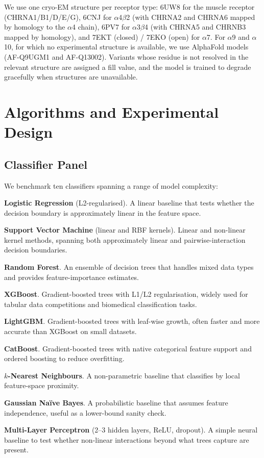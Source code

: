 \documentclass{ws-procs11x85}
\begin{document}
We use one cryo-EM structure per receptor type: 6UW8 for the muscle
receptor (CHRNA1/B1/D/E/G), 6CNJ for $\alpha$4$\beta$2 (with CHRNA2 and
CHRNA6 mapped by homology to the $\alpha$4 chain), 6PV7 for
$\alpha$3$\beta$4 (with CHRNA5 and CHRNB3 mapped by homology), and 7EKT
(closed) / 7EKO (open) for $\alpha$7. For $\alpha$9 and $\alpha$10, for
which no experimental structure is available, we use AlphaFold models
(AF-Q9UGM1 and AF-Q13002). Variants whose residue is not resolved in the
relevant structure are assigned a fill value, and the model is trained
to degrade gracefully when structures are unavailable.

\section{Algorithms and Experimental Design}\label{sec:algorithms}

\subsection{Classifier Panel}

We benchmark ten classifiers spanning a range of model complexity:

\begin{itemlist}
\item \textbf{Logistic Regression} (L2-regularised). A linear baseline
  that tests whether the decision boundary is approximately linear in
  the feature space.
\item \textbf{Support Vector Machine} (linear and RBF kernels). Linear
  and non-linear kernel methods, spanning both approximately linear and
  pairwise-interaction decision boundaries.
\item \textbf{Random Forest}. An ensemble of decision trees that handles
  mixed data types and provides feature-importance estimates.
\item \textbf{XGBoost}. Gradient-boosted trees with L1/L2 regularisation,
  widely used for tabular data competitions and biomedical
  classification tasks.
\item \textbf{LightGBM}. Gradient-boosted trees with leaf-wise growth,
  often faster and more accurate than XGBoost on small datasets.
\item \textbf{CatBoost}. Gradient-boosted trees with native categorical
  feature support and ordered boosting to reduce overfitting.
\item \textbf{$k$-Nearest Neighbours}. A non-parametric baseline that
  classifies by local feature-space proximity.
\item \textbf{Gaussian Na\"ive Bayes}. A probabilistic baseline that
  assumes feature independence, useful as a lower-bound sanity check.
\item \textbf{Multi-Layer Perceptron} (2–3 hidden layers, ReLU, dropout).
  A simple neural baseline to test whether non-linear interactions
  beyond what trees capture are present.
\end{itemlist}
\end{document}
